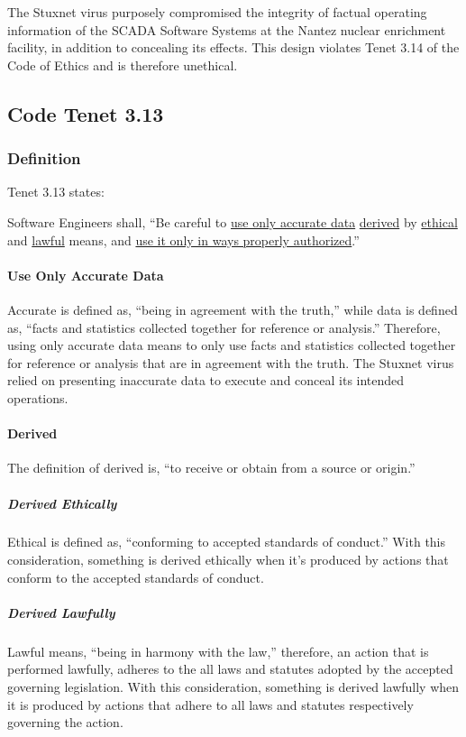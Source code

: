 \documentclass[12pt]{article}
\begin{document}
\begin{multicols}{2}
The Stuxnet virus purposely compromised the integrity of factual operating information of the SCADA Software Systems at the Nantez nuclear enrichment facility, in addition to concealing its effects. This design violates Tenet 3.14 of the Code of Ethics and is therefore unethical.


\subsection{Code Tenet 3.13}

\subsubsection{Definition}

Tenet 3.13  states:
\begin{framed}
Software Engineers shall, ``Be careful to \ul{use only accurate data} \ul{derived} by \ul{ethical} and \ul{lawful} means, and \ul{use it only in ways properly authorized}.''\cite{softwareEngineeringCodeOfEthics}
\end{framed}

\paragraph{Use Only Accurate Data}
Accurate is defined as, ``being in agreement with the truth,'' while data is defined as, ``facts and statistics collected together for reference or analysis.''\cite{cambridgeDictionary} Therefore, using only accurate data means to only use facts and statistics collected together for reference or analysis that are in agreement with the truth. The Stuxnet virus relied on presenting inaccurate data to execute and conceal its intended operations.

\paragraph{Derived}
The definition of derived is, ``to receive or obtain from a source or origin.''\cite{softwareDefinition}

\subparagraph{Derived Ethically}
Ethical is defined as, ``conforming to accepted standards of conduct.''\cite{cambridgeDictionary} With this consideration, something is derived ethically when it's produced by actions that conform to the accepted standards of conduct.

\subparagraph{Derived Lawfully}
Lawful means, ``being in harmony with the law,'' therefore, an action that is performed lawfully, adheres to the all laws and statutes adopted by the accepted governing legislation.\cite{cambridgeDictionary} With this consideration, something is derived lawfully when it is produced by actions that adhere to all laws and statutes respectively governing the action.


\end{multicols}
\end{document}
